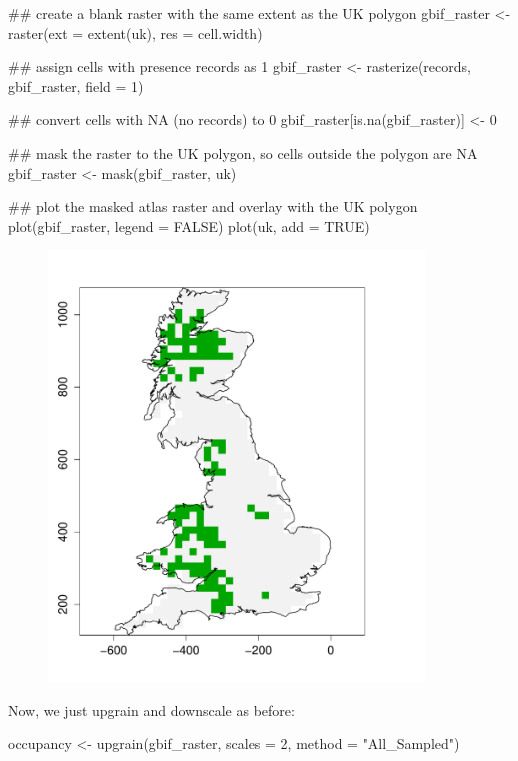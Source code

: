 \documentclass{article}[12pt, a4paper]
\begin{document}
\begin{Schunk}
\begin{Sinput}
## create a blank raster with the same extent as the UK polygon
gbif_raster <- raster(ext = extent(uk),
                      res = cell.width)

## assign cells with presence records as 1
gbif_raster <- rasterize(records, gbif_raster, field = 1)

## convert cells with NA (no records) to 0
gbif_raster[is.na(gbif_raster)] <- 0

## mask the raster to the UK polygon, so cells outside the polygon are NA
gbif_raster <- mask(gbif_raster, uk)

## plot the masked atlas raster and overlay with the UK polygon
plot(gbif_raster, legend = FALSE)
plot(uk, add = TRUE)
\end{Sinput}
\end{Schunk}

\begin{figure}[!ht]
\centering
\includegraphics[width=10cm]{Downscaling-downscale40}
\end{figure}

\newpage
Now, we just upgrain and downscale as before:

\begin{Schunk}
\begin{Sinput}
occupancy <- upgrain(gbif_raster,
                     scales = 2,
                     method = "All_Sampled")
\end{Sinput}
\end{Schunk}
\end{document}
